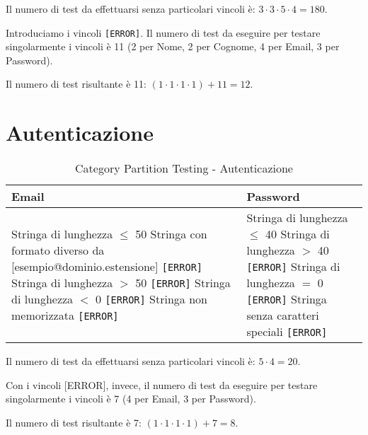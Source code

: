 Il numero di test da effettuarsi senza particolari vincoli è: $3 \cdot 3 \cdot 5 \cdot 4 = 180$.

Introduciamo i vincoli \texttt{[ERROR]}. Il numero di test da eseguire per testare singolarmente i vincoli è 11 (2 per Nome, 2 per Cognome, 4 per Email, 3 per Password).

Il numero di test risultante è 11: $(1 \cdot 1 \cdot 1 \cdot 1) + 11 = 12$.

\section{Autenticazione}
\begin{table}[H]
    \centering
    \footnotesize
    \renewcommand{\arraystretch}{1.5}
    \begin{tabular}{|p{6cm}|p{6cm}|}
       \hline
       \textbf{Email} & \textbf{Password} \\
       \hline
       Stringa di lunghezza $\leq$ 50 \newline
	   Stringa con formato diverso da [esempio@dominio.estensione] \texttt{[ERROR]} \newline
	   Stringa di lunghezza $>$ 50 \texttt{[ERROR]} \newline
       Stringa di lunghezza $<$ 0 \texttt{[ERROR]} \newline
       Stringa non memorizzata \texttt{[ERROR]} &

       Stringa di lunghezza $\leq$ 40 \newline
       Stringa di lunghezza $>$ 40 \texttt{[ERROR]} \newline
       Stringa di lunghezza $=$ 0 \texttt{[ERROR]} \newline
       Stringa senza caratteri speciali \texttt{[ERROR]} \\
       \hline
    \end{tabular}
    \caption{Category Partition Testing - Autenticazione}
\end{table}

\noindent Il numero di test da effettuarsi senza particolari vincoli è: $5 \cdot 4 = 20$.

\noindent Con i vincoli [ERROR], invece, il numero di test da eseguire per testare singolarmente i vincoli è 7 (4 per Email, 3 per Password).

\noindent Il numero di test risultante è 7: $(1 \cdot 1 \cdot 1 \cdot 1) + 7 = 8$.

